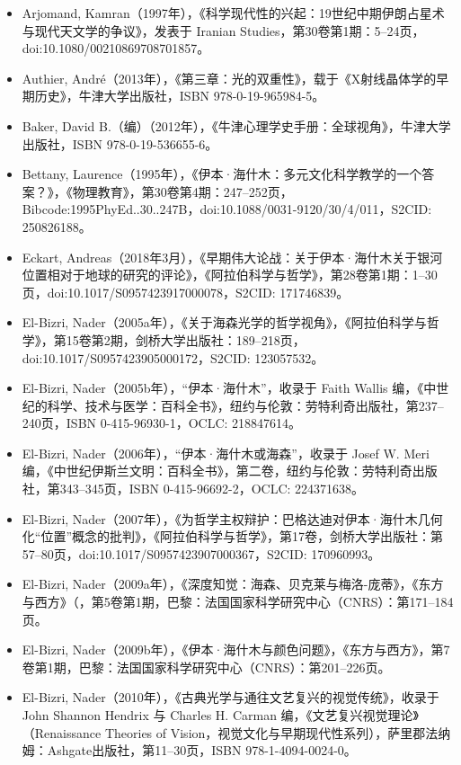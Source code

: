 \begin{itemize}
\item Arjomand, Kamran（1997年），《科学现代性的兴起：19世纪中期伊朗占星术与现代天文学的争议》，发表于 Iranian Studies，第30卷第1期：5–24页，doi:10.1080/00210869708701857。
\item Authier, André（2013年），《第三章：光的双重性》，载于《X射线晶体学的早期历史》，牛津大学出版社，ISBN 978-0-19-965984-5。
\item Baker, David B.（编）（2012年），《牛津心理学史手册：全球视角》，牛津大学出版社，ISBN 978-0-19-536655-6。
\item Bettany, Laurence（1995年），《伊本·海什木：多元文化科学教学的一个答案？》，《物理教育》，第30卷第4期：247–252页，Bibcode:1995PhyEd..30..247B，doi:10.1088/0031-9120/30/4/011，S2CID: 250826188。
\item Eckart, Andreas（2018年3月），《早期伟大论战：关于伊本·海什木关于银河位置相对于地球的研究的评论》，《阿拉伯科学与哲学》，第28卷第1期：1–30页，doi:10.1017/S0957423917000078，S2CID: 171746839。
\item El-Bizri, Nader（2005a年），《关于海森光学的哲学视角》，《阿拉伯科学与哲学》，第15卷第2期，剑桥大学出版社：189–218页，doi:10.1017/S0957423905000172，S2CID: 123057532。
\item El-Bizri, Nader（2005b年），“伊本·海什木”，收录于 Faith Wallis 编，《中世纪的科学、技术与医学：百科全书》，纽约与伦敦：劳特利奇出版社，第237–240页，ISBN 0-415-96930-1，OCLC: 218847614。
\item El-Bizri, Nader（2006年），“伊本·海什木或海森”，收录于 Josef W. Meri 编，《中世纪伊斯兰文明：百科全书》，第二卷，纽约与伦敦：劳特利奇出版社，第343–345页，ISBN 0-415-96692-2，OCLC: 224371638。
\item El-Bizri, Nader（2007年），《为哲学主权辩护：巴格达迪对伊本·海什木几何化“位置”概念的批判》，《阿拉伯科学与哲学》，第17卷，剑桥大学出版社：第57–80页，doi:10.1017/S0957423907000367，S2CID: 170960993。
\item El-Bizri, Nader（2009a年），《深度知觉：海森、贝克莱与梅洛-庞蒂》，《东方与西方》（，第5卷第1期，巴黎：法国国家科学研究中心（CNRS）：第171–184页。
\item El-Bizri, Nader（2009b年），《伊本·海什木与颜色问题》，《东方与西方》，第7卷第1期，巴黎：法国国家科学研究中心（CNRS）：第201–226页。
\item El-Bizri, Nader（2010年），《古典光学与通往文艺复兴的视觉传统》，收录于 John Shannon Hendrix 与 Charles H. Carman 编，《文艺复兴视觉理论》（Renaissance Theories of Vision，视觉文化与早期现代性系列），萨里郡法纳姆：Ashgate出版社，第11–30页，ISBN 978-1-4094-0024-0。

\end{itemize}
